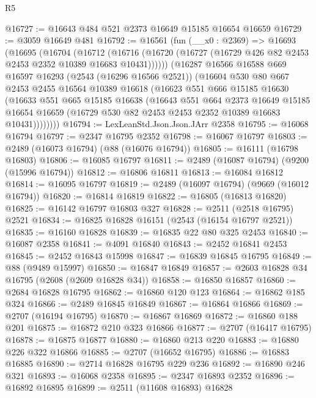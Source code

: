 \begin{lexlean}{R5}
\begin{coremodule}
@16727 := @16643 @484 @521 @2373 @16649 @15185 @16654 @16659
@16729 := @3059 @16649 @481
@16792 := @16561
    (fun (__x0 : @2369) =>
    @16693
      (@16695
        (@16704
          (@16712
            (@16716 (@16720 (@16727 (@16729 @426 @82 @2453 @2453 @2352 @10389 @16683 @10431))))))
        (@16287
          @16566
          @16588
          @669
          @16597
          @16293
          (@2543 (@16296 @16566 @2521))
          (@16604
            @530
            @80
            @667
            @2453
            @2455
            @16564
            @10389
            @16618
            (@16623
              @551
              @666
              @15185
              @16630
              (@16633
                @551
                @665
                @15185
                @16638
                (@16643
                  @551
                  @664
                  @2373
                  @16649
                  @15185
                  @16654
                  @16659
                  (@16729 @530 @82 @2453 @2453 @2352 @10389 @16683 @10431))))))))
@16794 := LexLeanStd.Json.Json.JArr @2358
@16795 := @16068 @16794
@16797 := @2347 @16795 @2352
@16798 := @16067 @16797
@16803 := @2489 (@16073 @16794) (@88 (@16076 @16794))
@16805 := @16111 (@16798 @16803)
@16806 := @16085 @16797
@16811 := @2489 (@16087 @16794) (@9200 (@15996 @16794))
@16812 := @16806 @16811
@16813 := @16084 @16812
@16814 := @16095 @16797
@16819 := @2489 (@16097 @16794) (@9669 (@16012 @16794))
@16820 := @16814 @16819
@16822 := @16805 (@16813 @16820)
@16825 := @16142 @16797 @16803 @327
@16828 := @2511 (@2518 @16795) @2521
@16834 := @16825 @16828 @16151 (@2543 (@16154 @16797 @2521))
@16835 := @16160 @16828
@16839 := @16835 @22 @80 @325 @2453
@16840 := @16087 @2358
@16841 := @4091 @16840
@16843 := @2452 @16841 @2453
@16845 := @2452 @16843 @15998
@16847 := @16839 @16845 @16795
@16849 := @88 (@9489 @15997)
@16850 := @16847 @16849
@16857 := @2603 @16828 @34 @16795 (@2608 (@2609 @16828 @34))
@16858 := @16850 @16857
@16860 := @2684 @16828 @16795
@16862 := @16860 @120 @123
@16864 := @16862 @185 @324
@16866 := @2489 @16845 @16849
@16867 := @16864 @16866
@16869 := @2707 (@16194 @16795)
@16870 := @16867 @16869
@16872 := @16860 @188 @201
@16875 := @16872 @210 @323 @16866
@16877 := @2707 (@16417 @16795)
@16878 := @16875 @16877
@16880 := @16860 @213 @220
@16883 := @16880 @226 @322 @16866
@16885 := @2707 (@16652 @16795)
@16886 := @16883 @16885
@16890 := @2714 @16828 @16795 @229 @236
@16892 := @16890 @246 @321
@16893 := @16068 @2358
@16895 := @2347 @16893 @2352
@16896 := @16892 @16895
@16899 := @2511 (@11608 @16893) @16828

\end{coremodule}
\end{lexlean}
